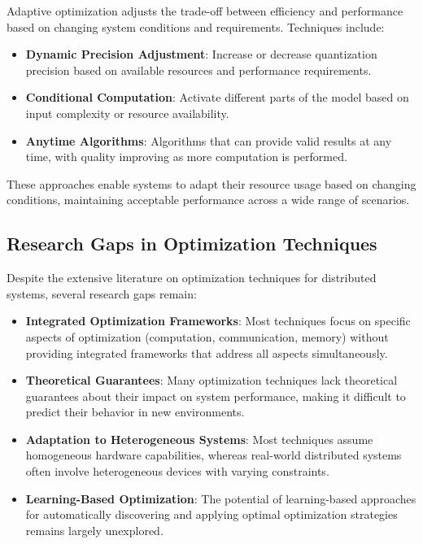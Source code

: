 \documentclass{article}
\begin{document}
Adaptive optimization adjusts the trade-off between efficiency and performance based on changing system conditions and requirements. Techniques include:

\begin{itemize}
    \item \textbf{Dynamic Precision Adjustment}: Increase or decrease quantization precision based on available resources and performance requirements.
    
    \item \textbf{Conditional Computation}: Activate different parts of the model based on input complexity or resource availability.
    
    \item \textbf{Anytime Algorithms}: Algorithms that can provide valid results at any time, with quality improving as more computation is performed.
\end{itemize}

These approaches enable systems to adapt their resource usage based on changing conditions, maintaining acceptable performance across a wide range of scenarios.

\subsection{Research Gaps in Optimization Techniques}

Despite the extensive literature on optimization techniques for distributed systems, several research gaps remain:

\begin{itemize}
    \item \textbf{Integrated Optimization Frameworks}: Most techniques focus on specific aspects of optimization (computation, communication, memory) without providing integrated frameworks that address all aspects simultaneously.
    
    \item \textbf{Theoretical Guarantees}: Many optimization techniques lack theoretical guarantees about their impact on system performance, making it difficult to predict their behavior in new environments.
    
    \item \textbf{Adaptation to Heterogeneous Systems}: Most techniques assume homogeneous hardware capabilities, whereas real-world distributed systems often involve heterogeneous devices with varying constraints.
    
    \item \textbf{Learning-Based Optimization}: The potential of learning-based approaches for automatically discovering and applying optimal optimization strategies remains largely unexplored.
\end{itemize}
\end{document}
